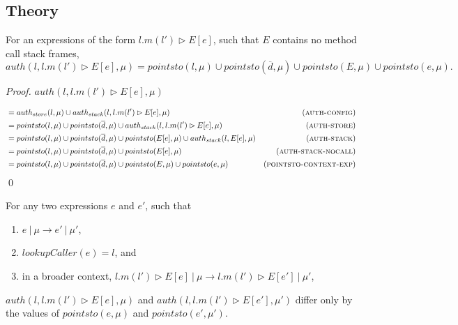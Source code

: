 \documentclass{llncs}
\begin{document}
\newpage

\subsection{Theory}

\begin{lemma}
For an expressions of the form $l.m(l') \rhd E[e]$, such that $E$ contains no method call stack frames,
\[
auth(l, l.m(l') \rhd E[e], \mu) = pointsto(l, \mu) \cup pointsto(\overline{d}, \mu) \cup pointsto(E, \mu) \cup pointsto(e, \mu).
\]
\end{lemma}

\begin{proof} $auth(l, l.m(l') \rhd E[e], \mu)$

\vspace{-17pt}

\begin{align*}
&= auth_{store}(l, \mu) \cup auth_{stack}(l, l.m(l') \rhd E[e], \mu) & (\textsc{auth-config})\\
&= pointsto(l, \mu) \cup pointsto(\overline{d}, \mu) \cup auth_{stack}(l, l.m(l') \rhd E[e], \mu) & (\textsc{auth-store})\\
&= pointsto(l, \mu) \cup pointsto(\overline{d}, \mu) \cup pointsto(E[e], \mu) \cup auth_{stack}(l, E[e], \mu) & (\textsc{auth-stack})\\
&= pointsto(l, \mu) \cup pointsto(\overline{d}, \mu) \cup pointsto(E[e], \mu) & (\textsc{auth-stack-nocall})\\
&= pointsto(l, \mu) \cup pointsto(\overline{d}, \mu) \cup pointsto(E, \mu) \cup pointsto(e, \mu) & (\textsc{pointsto-context-exp})
\end{align*}\qed

\end{proof}


\begin{lemma}
For any two expressions $e$ and $e'$, such that
\begin{enumerate}
\item $e~|~\mu \longrightarrow e'~|~\mu'$,
\item $lookupCaller(e) = l$, and
\item in a broader context, $l.m(l') \rhd E[e]~|~\mu \longrightarrow l.m(l') \rhd E[e']~|~\mu'$,
\end{enumerate}
$auth(l, l.m(l') \rhd E[e], \mu)$ and $auth(l, l.m(l') \rhd E[e'], \mu')$ differ only by the values of $pointsto(e, \mu)$ and $pointsto(e', \mu')$.
\end{lemma}
\end{document}
